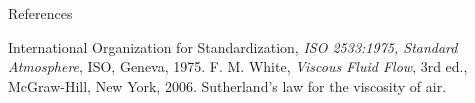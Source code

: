 \documentclass[aspectratio=169,11pt]{beamer}
\begin{document}
\begin{frame}{References}
\begin{reflist}
   
   
   
   
   International Organization for Standardization, \emph{ISO
        2533:1975, Standard Atmosphere}, ISO, Geneva, 1975.
   F. M. White, \emph{Viscous Fluid Flow}, 3rd ed.,
        McGraw-Hill, New York, 2006. Sutherland's law for the viscosity of
        air.
\end{reflist}
\end{frame}
\end{document}
